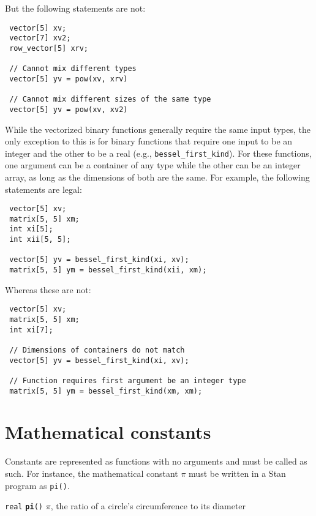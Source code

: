 \documentclass[
  10pt,
]{book}
\begin{document}
But the following statements are not:

\begin{verbatim}
 vector[5] xv;
 vector[7] xv2;
 row_vector[5] xrv;
 
 // Cannot mix different types
 vector[5] yv = pow(xv, xrv)

 // Cannot mix different sizes of the same type
 vector[5] yv = pow(xv, xv2)
\end{verbatim}

While the vectorized binary functions generally require the same input types,
the only exception to this is for binary functions that require one input to be
an integer and the other to be a real (e.g., \texttt{bessel\_first\_kind}). For these
functions, one argument can be a container of any type while the other can be
an integer array, as long as the dimensions of both are the same. For example,
the following statements are legal:

\begin{verbatim}
 vector[5] xv;
 matrix[5, 5] xm;
 int xi[5];
 int xii[5, 5];
 
 vector[5] yv = bessel_first_kind(xi, xv);
 matrix[5, 5] ym = bessel_first_kind(xii, xm);
\end{verbatim}

Whereas these are not:

\begin{verbatim}
 vector[5] xv;
 matrix[5, 5] xm;
 int xi[7];

 // Dimensions of containers do not match
 vector[5] yv = bessel_first_kind(xi, xv);

 // Function requires first argument be an integer type
 matrix[5, 5] ym = bessel_first_kind(xm, xm);
\end{verbatim}

\hypertarget{built-in-constants}{%
\section{Mathematical constants}\label{built-in-constants}}

Constants are represented as functions with no arguments and must be
called as such. For instance, the mathematical constant \(\pi\) must be
written in a Stan program as \texttt{pi()}.


\texttt{real} \textbf{\texttt{pi}}\texttt{()}\newline
\(\pi\), the ratio of a circle's circumference to its diameter
\end{document}
